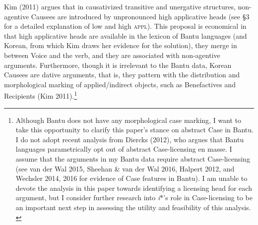 \documentclass[12pt]{article}
\newcommand\textstyleTextonotapieCar[1]{{\fontsize{10pt}{12.0pt}\selectfont \textrm{#1}}}
\newenvironment{styleStandard}{\setlength\leftskip{0cm}\setlength\rightskip{0cm plus 1fil}\setlength\parindent{0cm}\setlength\parfillskip{0pt plus 1fil}\setlength\parskip{0in plus 1pt}\writerlistparindent\writerlistleftskip\leavevmode\normalfont\normalsize\writerlistlabel\ignorespaces}{\unskip\vspace{0.111in plus 0.0111in}\par}
\newcommand\writerlistleftskip{}
\newcommand\writerlistparindent{}
\newcommand\writerlistlabel{}
\begin{document}
\begin{styleStandard}
Kim (2011) argues that in causativized transitive and unergative structures, non-agentive Causees are introduced by unpronounced high applicative\textsc{ }heads (see §3 for a detailed explanation of low and high \textsc{appl).} This proposal is economical in that high applicative heads are available in the lexicon of Bantu languages (and Korean, from which Kim draws her evidence for the solution), they merge in between Voice and the verb, and they are associated with non-agentive arguments. Furthermore, though it is irrelevant to the Bantu data, Korean Causees are dative arguments, that is, they pattern with the distribution and morphological marking of applied/indirect objects, such as Benefactives and Recipients (Kim 2011).\footnote{\textstyleTextonotapieCar{ Although Bantu does not have any morphological case marking, I want to take this opportunity to clarify this paper's stance on abstract Case in Bantu. I do not adopt recent analysis from }\textstyleTextonotapieCar{Diercks (2012), who argues that Bantu languages parametrically opt out of abstract Case-licensing en masse. I assume that the arguments in my Bantu data require abstract Case-licensing (see }\textstyleTextonotapieCar{van der Wal 2015, }\textstyleTextonotapieCar{Sheehan \& van der Wal 2016, }\textstyleTextonotapieCar{Halpert 2012, and }\textstyleTextonotapieCar{Wechsler 2014, 2016 for}\textrm{ }\textstyleTextonotapieCar{evidence of Case features in Bantu). I am unable to devote the analysis in this paper towards identifying a licensing head for each argument, but I consider further research into \textit{i}*’s role in Case-licensing to be an important next step in assessing the utility and feasibility of this analysis.}\textrm{ }\par } 
\end{styleStandard}
\end{document}
